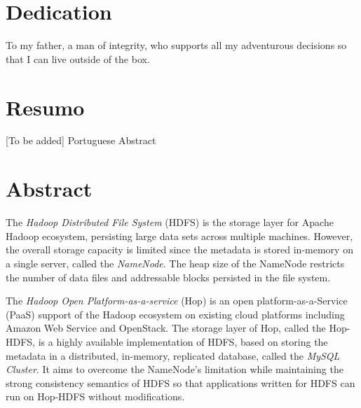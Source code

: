 \cleardoublepage


\chapter*{Dedication}
\thispagestyle{empty}

\vfill
\mbox{}
\vfill\Large
\begin{flushright}
  \begin{minipage}{8cm}
    \begin{center}
	To my father, a man of integrity, who supports all my adventurous decisions so that I can live outside of the box.

    \end{center}
  \end{minipage}
\end{flushright}
\normalsize\vfill

\cleardoublepage


\chapter*{Resumo}
\thispagestyle{empty}

[To be added] Portuguese Abstract

\newpage


\chapter*{Abstract}
\thispagestyle{empty}

The \textit{Hadoop Distributed File System} (HDFS) is the storage layer for Apache Hadoop ecosystem, persisting large data sets across multiple machines. However, the overall storage capacity is limited since the metadata is stored in-memory on a single server, called the \textit{NameNode}. The heap size of the NameNode restricts the number of data files and addressable blocks persisted in the file system.

\noindent The \textit{Hadoop Open Platform-as-a-service} (Hop) is an open platform-as-a-Service (PaaS) support of the Hadoop ecosystem on existing cloud platforms including Amazon Web Service and OpenStack. The storage layer of Hop, called the Hop-HDFS, is a highly available implementation of HDFS, based on storing the metadata in a distributed, in-memory, replicated database, called the \textit{MySQL Cluster}. It aims to overcome the NameNode's limitation while maintaining the strong consistency semantics of HDFS so that applications written for HDFS can run on Hop-HDFS without 
modifications.

